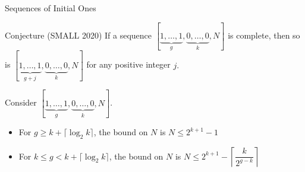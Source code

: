 \documentclass[handout]{beamer}
\begin{document}
\begin{frame}{Sequences of Initial Ones}
\begin{alertblock}{Conjecture (SMALL 2020)}
If a sequence $[\underbrace{1, \ldots,1}_g,\underbrace{0,\ldots,0}_k, N]$  is complete, then so is  $[\underbrace{1, \ldots,1}_{g+j},\underbrace{0,\ldots,0}_k, N]$ for any positive integer $j.$
\end{alertblock}

\pause
\begin{theorem}[SMALL 2020]
Consider $[\underbrace{1, \ldots,1}_g,\underbrace{0,\ldots,0}_k, N]$.
\begin{itemize}
    \item For $g \ge k + \lceil \log_2k \rceil$, the bound on $N$ is $N \le 2^{k+1}-1$
    \item For $k \le g < k + \lceil \log_2k \rceil$, the bound on $N$ is $N \le 2^{k+1} - \left\lceil \dfrac{k}{2^{g-k}} \right\rceil$
\end{itemize}
\end{theorem}
\end{frame}

\begin{comment}
\begin{frame}{Idea of Proof}
\begin{theorem}[SMALL 2020]
\begin{itemize}
    \item For $g \ge k + \lceil \log_2k \rceil$, the bound on $N$ is $N \le 2^{k+1}-1$
    \item For $k \le g < k + \lceil \log_2k \rceil$, the bound on $N$ is $N \le 2^{k+1} - \left\lceil \dfrac{k}{2^{g-k}} \right\rceil$
\end{itemize}
\end{theorem}
\pause
\begin{theorem}[SMALL 2020]
    The PLRS $\{H_i\}_{i \ge 1}$ generated by $[c_1, \dots, c_L]$ is complete if $$\begin{cases} B_{H, n} \ge 0, \; 1 \le n < L \\ B_{H, n} > 0, \; L \le n \le 2L-1 \end{cases}$$
\end{theorem}
\end{frame}
\end{comment}
\end{document}
